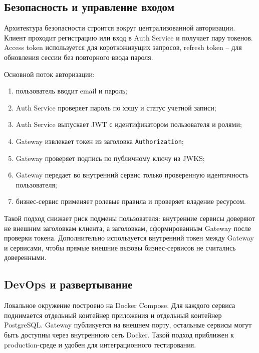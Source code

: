 
\subsection{Безопасность и управление входом}

Архитектура безопасности строится вокруг централизованной авторизации. Клиент проходит регистрацию или вход в Auth Service и получает пару токенов. Access token используется для короткоживущих запросов, refresh token -- для обновления сессии без повторного ввода пароля.

Основной поток авторизации:
\begin{enumerate}
    \item пользователь вводит email и пароль;
    \item Auth Service проверяет пароль по хэшу и статус учетной записи;
    \item Auth Service выпускает JWT с идентификатором пользователя и ролями;
    \item Gateway извлекает токен из заголовка \texttt{Authorization};
    \item Gateway проверяет подпись по публичному ключу из JWKS;
    \item Gateway передает во внутренний сервис только проверенную идентичность пользователя;
    \item бизнес-сервис применяет ролевые правила и проверяет владение ресурсом.
\end{enumerate}

Такой подход снижает риск подмены пользователя: внутренние сервисы доверяют не внешним заголовкам клиента, а заголовкам, сформированным Gateway после проверки токена. Дополнительно используется внутренний токен между Gateway и сервисами, чтобы прямые внешние вызовы бизнес-сервисов не считались доверенными.

\subsection{DevOps и развертывание}

Локальное окружение построено на Docker Compose. Для каждого сервиса поднимается отдельный контейнер приложения и отдельный контейнер PostgreSQL. Gateway публикуется на внешнем порту, остальные сервисы могут быть доступны через внутреннюю сеть Docker. Такой подход приближен к production-среде и удобен для интеграционного тестирования.


